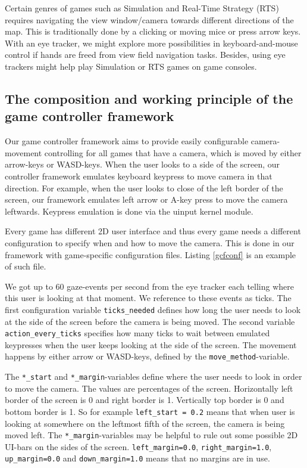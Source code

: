\documentclass[english]{tktltiki}
\begin{document}
Certain genres of games such as Simulation and Real-Time Strategy (RTS) requires navigating the view window/camera towards different directions of the map. This is traditionally done by a clicking or moving mice or press arrow keys. With an eye tracker, we might explore more possibilities in keyboard-and-mouse control if hands are freed from view field navigation tasks. Besides, using eye trackers might help play Simulation or RTS games on game consoles.


\subsection{The composition and working principle of the game controller framework}

Our game controller framework aims to provide easily configurable camera-movement controlling for all games that have a camera, which is moved by either arrow-keys or WASD-keys. When the user looks to a side of the screen, our controller framework emulates keyboard keypress to move camera in that direction. For example, when the user looks to close of the left border of the screen, our framework emulates left arrow or A-key press to move the camera leftwards. Keypress emulation is done via the uinput kernel module.

Every game has different 2D user interface and thus every game needs a different configuration to specify when and how to move the camera. This is done in our framework with game-specific configuration files. Listing \ref{gcfconf} is an example of such file.

We got up to 60 gaze-events per second from the eye tracker each telling where this user is looking at that moment. We reference to these events as ticks. The first configuration variable \verb|ticks_needed| defines how long the user needs to look at the side of the screen before the camera is being moved. The second variable \verb|action_every_ticks| specifies how many ticks to wait between emulated keypresses when the user keeps looking at the side of the screen. The movement happens by either arrow or WASD-keys, defined by the \verb|move_method|-variable.

The \verb|*_start| and \verb|*_margin|-variables define where the user needs to look in order to move the camera. The values are percentages of the screen. Horizontally left border of the screen is 0 and right border is 1. Vertically top border is 0 and bottom border is 1. So for example \verb|left_start = 0.2| means that when user is looking at somewhere on the leftmost fifth of the screen, the camera is being moved left. The \verb|*_margin|-variables may be helpful to rule out some possible 2D UI-bars on the sides of the screen. \verb|left_margin=0.0|, \verb|right_margin=1.0|, \verb|up_margin=0.0| and \verb|down_margin=1.0| means that no margins are in use.
\end{document}
